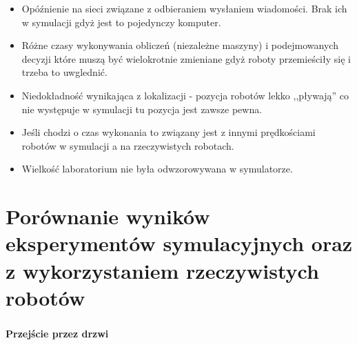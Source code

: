 \begin{frame}
{\begin{itemize}
	\item Opóźnienie na sieci związane z odbieraniem wysłaniem wiadomości.  Brak ich w symulacji gdyż jest to pojedynczy komputer.
	\item Różne czasy wykonywania obliczeń (niezależne maszyny) i podejmowanych decyzji które muszą być wielokrotnie zmieniane gdyż roboty przemieściły się i trzeba to uwglednić.
	
	\item Niedokładność wynikająca z lokalizacji - pozycja robotów lekko ,,pływają'' co nie występuje w symulacji tu pozycja jest zawsze pewna.
	
	\item Jeśli chodzi o czas wykonania to związany jest z innymi prędkościami robotów w symulacji a na rzeczywistych robotach. 
	\item Wielkość laboratorium nie była odwzorowywana w symulatorze.
\end{itemize}

}

\end{frame}


\section*{Porównanie wyników eksperymentów symulacyjnych oraz z wykorzystaniem rzeczywistych robotów}
\begin{frame}
\frametitle{\secname}
\framesubtitle{Przejście przez drzwi}
\begin{figure}[ht] %
	\captionsetup[subfigure]{labelformat=empty}
	\centering
\end{figure}
\end{frame}
